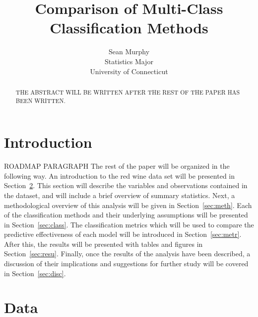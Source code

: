 \documentclass[12pt]{article}
\title{Comparison of Multi-Class Classification Methods}
\author{Sean Murphy\\
  Statistics Major\\
  University of Connecticut
}
\begin{document}
\maketitle

\begin{abstract}
THE ABSTRACT WILL BE WRITTEN AFTER THE REST OF THE PAPER HAS BEEN WRITTEN. 
\end{abstract}


\section{Introduction}
\label{sec:intro}





ROADMAP PARAGRAPH
The rest of the paper will be organized in the following way.  
An introduction to the red wine data set will be presented in 
Section~\ref{sec:data}.  This section will describe the variables 
and observations contained in the dataset, and will include a brief 
overview of summary statistics.  Next, a methodological overview of 
this analysis will be given in Section~\ref{sec:meth}.  Each of the 
classification methods and their underlying assumptions will be 
presented in Section~\ref{sec:class}.  The classification metrics 
which will be used to compare the predictive effectiveness of each 
model will be introduced in Section~\ref{sec:metr}.  After this, 
the results will be presented with tables and figures in 
Section~\ref{sec:resu}.  Finally, once the results of the analysis 
have been described, a discussion of their implications and suggestions 
for further study will be covered in Section~\ref{sec:disc}.


\section{Data}
\label{sec:data}
\end{document}
